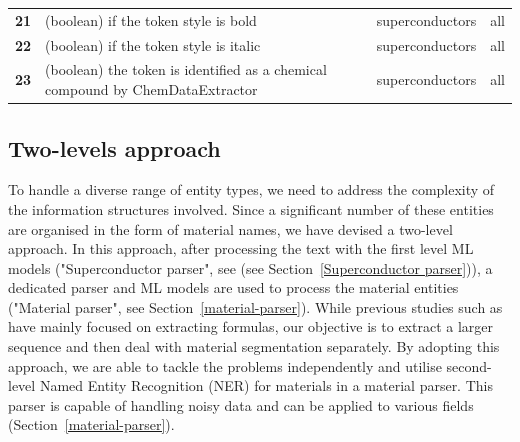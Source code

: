 \begin{table}
\begin{tabular}{l m{30em} c c}
        \textbf{21}   & (boolean) if the token style is bold & superconductors & all                   \\
        \textbf{22}   & (boolean) if the token style is italic & superconductors & all                   \\
        \textbf{23}   & (boolean) the token is identified as a chemical compound by ChemDataExtractor\cite{chemdataextractor}                                                                                                                                                    & superconductors & all                   \\
        \bottomrule
    \end{tabular}
    \label{tab:ML-model-features}
\end{table}

\subsection{Two-levels approach}
\label{sec:two-levels-approach}

To handle a diverse range of entity types, we need to address the complexity of the information structures involved. Since a significant number of these entities are organised in the form of material names, we have devised a two-level approach. In this approach, after processing the text with the first level ML models ("Superconductor parser", see (see Section~\ref{Superconductor parser})), a dedicated parser and ML models are used to process the material entities ("Material parser", see Section~\ref{material-parser}). 
While previous studies such as \cite{kononova2019text, court2020magnetic, dieb2015framework} have mainly focused on extracting formulas, our objective is to extract a larger sequence and then deal with material segmentation separately. By adopting this approach, we are able to tackle the problems independently and utilise second-level Named Entity Recognition (NER) for materials in a material parser. This parser is capable of handling noisy data and can be applied to various fields (Section~\ref{material-parser}).

